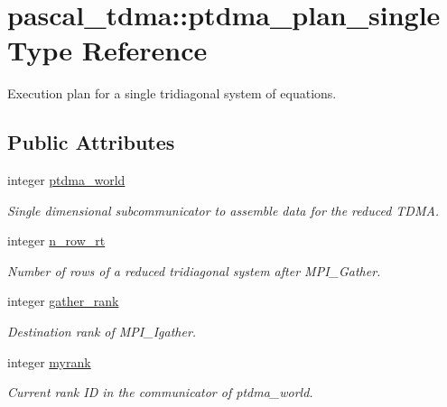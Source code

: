 \hypertarget{structpascal__tdma_1_1ptdma__plan__single}{}\section{pascal\+\_\+tdma\+::ptdma\+\_\+plan\+\_\+single Type Reference}
\label{structpascal__tdma_1_1ptdma__plan__single}


Execution plan for a single tridiagonal system of equations.  


\subsection*{Public Attributes}
\begin{DoxyCompactItemize}
\item 
integer \mbox{\hyperlink{structpascal__tdma_1_1ptdma__plan__single_a073cddefd8ef983b185b6727d8ad7de6}{ptdma\+\_\+world}}
\begin{DoxyCompactList}\small\item\em Single dimensional subcommunicator to assemble data for the reduced T\+D\+MA. \end{DoxyCompactList}\item 
integer \mbox{\hyperlink{structpascal__tdma_1_1ptdma__plan__single_a91fd8fb919f9b7d3137b13fcaa55dc1b}{n\+\_\+row\+\_\+rt}}
\begin{DoxyCompactList}\small\item\em Number of rows of a reduced tridiagonal system after M\+P\+I\+\_\+\+Gather. \end{DoxyCompactList}\item 
integer \mbox{\hyperlink{structpascal__tdma_1_1ptdma__plan__single_af0d3b3bce8b9956aa9e80ba0712a9a9d}{gather\+\_\+rank}}
\begin{DoxyCompactList}\small\item\em Destination rank of M\+P\+I\+\_\+\+Igather. \end{DoxyCompactList}\item 
integer \mbox{\hyperlink{structpascal__tdma_1_1ptdma__plan__single_af473533b36508af4e0752cee8d182334}{myrank}}
\begin{DoxyCompactList}\small\item\em Current rank ID in the communicator of ptdma\+\_\+world. \end{DoxyCompactList}\end{DoxyCompactItemize}
\textbf{ }\par
